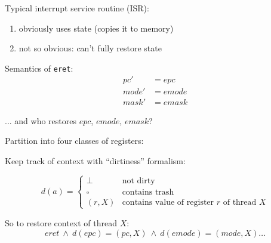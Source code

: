 \documentclass{beamer}
\begin{document}
\begin{frame}
Typical interrupt service routine (ISR):

\begin{enumerate} 
	\item obviously uses state (copies it to memory)
	\item not so obvious: can't fully restore state
\end{enumerate} 
\end{frame}

\begin{frame}
Semantics of \texttt{eret}:
\begin{align*}
	pc' &= epc \\
	mode' &= emode \\
	mask' &= emask 
\end{align*} 

... and who restores $epc$, $emode$, $emask$?
\end{frame} 

\begin{frame}
Partition into four classes of registers:

{
{\begin{center} 
\end{center}}
{\begin{center} 
\end{center}}}
{\begin{center} 
\end{center}}
\end{frame} 

\begin{frame} 
Keep track of context with ``dirtiness'' formalism:

\[ d(a) = \begin{cases} \bot & \text{not dirty} \\
	\square & \text{contains trash} \\
	(r,X) & \text{contains value of register $r$ of thread $X$}
 	\end{cases} \]

So to restore context of thread $X$:
\[ eret \ \land \ d(epc) = (pc,X) \ \land \ d(emode) = (mode,X) \ldots \]
\end{frame} 
\end{document}
